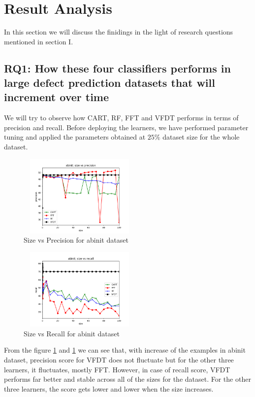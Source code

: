 \documentclass[sigplan]{acmart}\settopmatter{printfolios=true,printccs=false,printacmref=false}
\begin{document}
\section{Result Analysis}
In this section we will discuss the finidings in the light of research questions mentioned in section I.

\subsection{RQ1: How these four classifiers performs in large defect prediction datasets that will increment over time}
We will try to observe how CART, RF, FFT and VFDT performs in terms of precision and recall. Before deploying the learners, we have performed parameter tuning and applied the parameters obtained at $25\%$ dataset size for the whole dataset.

\begin{figure}[h]
	\includegraphics[width=6cm,height=4cm,keepaspectratio]{fig/abinit-size-precision.png}
	\caption{Size vs Precision for abinit dataset}
	\label{fig:ab-size-prec}
\end{figure}

\begin{figure}[h]
	\includegraphics[width=6cm,height=4cm,keepaspectratio]{fig/abinit-size-recall.png}
	\caption{Size vs Recall for abinit dataset}
	\label{fig:ab-size-rec}
\end{figure}

From the figure \ref{fig:ab-size-prec} and \ref{fig:ab-size-prec} we can see that, with increase of the examples in abinit dataset, precision score for VFDT does not fluctuate but for the other three learners, it fluctuates, mostly FFT. However, in case of recall score, VFDT performs far better and stable across all of the sizes for the dataset. For the other three learners, the score gets lower and lower when the size increases. 
\end{document}
